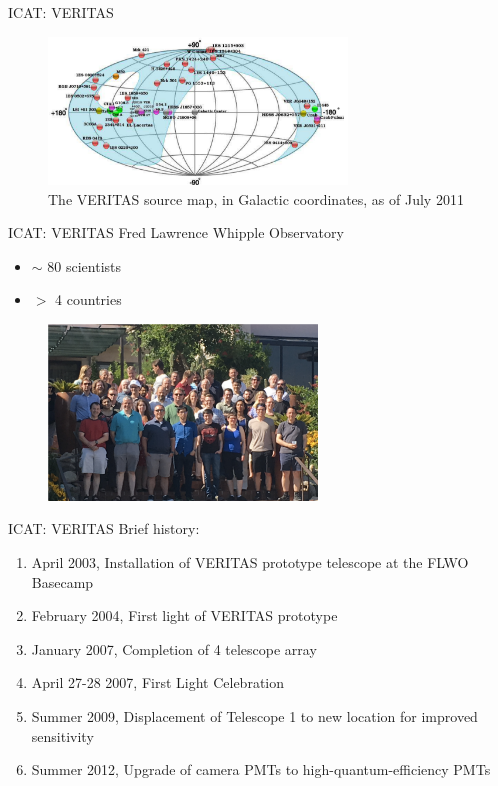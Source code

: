 \documentclass{beamer}
\begin{document}
\begin{frame}{ICAT: VERITAS}
    \begin{figure}[h]
        \includegraphics[width=300px]{VERITAS_source_map.png}
        \caption{The VERITAS source map, in Galactic coordinates, as of July 2011}
    \end{figure}
\end{frame}


\begin{frame}{ICAT: VERITAS}
    Fred Lawrence Whipple Observatory
    \begin{itemize}
        \item $\sim$ 80 scientists
        \item $>$ 4 countries
    \end{itemize}
    \begin{figure}[h]
        \includegraphics[width=270px]{VERITAS_collaboration.png}
    \end{figure}
\end{frame}


\begin{frame}{ICAT: VERITAS}
    Brief history:
    \begin{enumerate}
        \item April 2003, Installation of VERITAS prototype telescope at the FLWO Basecamp
        \item February 2004, First light of VERITAS prototype
        \item January 2007, Completion of 4 telescope array
        \item April 27-28 2007, First Light Celebration
        \item Summer 2009, Displacement of Telescope 1 to new location for improved sensitivity
        \item Summer 2012, Upgrade of camera PMTs to high-quantum-efficiency PMTs
    \end{enumerate}
\end{frame}
\end{document}
